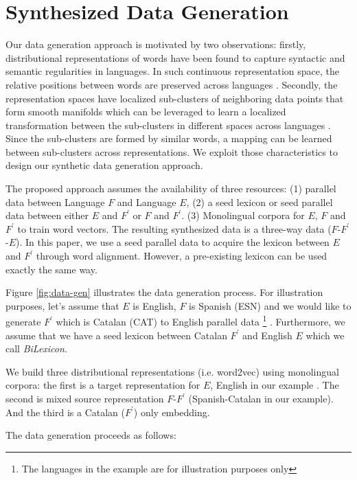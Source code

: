\documentclass[a4paper]{article}
\begin{document}
\section{Synthesized Data Generation}
\label{sec:datagen}

Our data generation approach is motivated by two observations: firstly, distributional  representations of words have been found to capture syntactic and semantic regularities in languages. In such continuous representation space, the relative positions between words are preserved across languages \cite{MikolovSCCD13}. Secondly, the representation spaces have localized sub-clusters of neighboring data points that form  smooth manifolds \cite{roweis2000nonlinear} which can be leveraged  to learn a localized transformation between the sub-clusters in different spaces across languages \cite{ZhaoHA15}. Since the sub-clusters are formed by similar words, a mapping can be learned between sub-clusters across representations. We exploit those characteristics to design our synthetic data generation approach.

   
The proposed  approach assumes the availability of three resources: (1) parallel data between Language $F$ and Language $E$,  (2) a seed lexicon or seed parallel data between either $E$ and $F^\prime$ or $F$ and $F^\prime$. (3) Monolingual corpora for $E$, $F$ and $F^\prime$ to train word vectors. The resulting synthesized data is a three-way data ($F$-$F^\prime$-$E$).  In this paper, we use a seed parallel data to acquire the lexicon between $E$ and $F^\prime$ through word alignment. However, a pre-existing lexicon can be used exactly the same way.

Figure \ref{fig:data-gen} illustrates the data generation process. For illustration purposes, let's assume that $E$ is English, $F$ is Spanish (ESN)  and we would like to generate $F^\prime$ which is Catalan (CAT) to English parallel data \footnote{The languages in the example are for illustration purposes only} . Furthermore, we assume that we have a seed lexicon between Catalan $F^\prime$  and English $E$ which we call  {\it BiLexicon}.

We build three distributional representations (i.e. word2vec)  using  monolingual corpora: the first is a  target representation for $E$, English in our example . The second is mixed source representation $F$-$F^\prime$ (Spanish-Catalan in our example). And the third is a Catalan ($F^\prime$) only embedding.

 
 The data generation  proceeds as follows:
\end{document}
